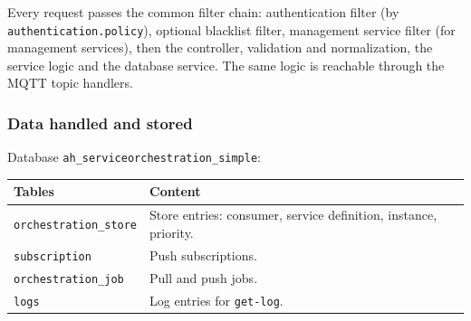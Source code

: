 \documentclass[a4paper]{arrowhead}
\begin{document}
Every request passes the common filter chain: authentication filter (by \texttt{authentication.policy}), optional blacklist filter, management service filter (for management services), then the controller, validation and normalization, the service logic and the database service. The same logic is reachable through the MQTT topic handlers.

\subsubsection{Data handled and stored}

Database \texttt{ah\_serviceorchestration\_simple}:

\noindent\begin{longtable}{| p{6.4cm} | p{8.8cm} |} \hline
\rowcolor{gray!33} Tables & Content \\ \hline \endhead
\texttt{orchestration\_\allowbreak{}store} & Store entries: consumer, service definition, instance, priority. \\ \hline
\texttt{subscription} & Push subscriptions. \\ \hline
\texttt{orchestration\_\allowbreak{}job} & Pull and push jobs. \\ \hline
\texttt{logs} & Log entries for \texttt{get-\allowbreak{}log}. \\ \hline
\end{longtable}
\end{document}
